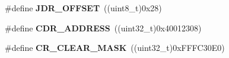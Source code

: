 \begin{DoxyCompactItemize}
\item 
\hypertarget{group___a_d_c_gad2480fae33dfd1308157c313af8e6a5d}{\#define {\bfseries J\-D\-R\-\_\-\-O\-F\-F\-S\-E\-T}~((uint8\-\_\-t)0x28)}\label{group___a_d_c_gad2480fae33dfd1308157c313af8e6a5d}

\item 
\hypertarget{group___a_d_c_ga92ecbad71393fbbf41b5d030ecc16899}{\#define {\bfseries C\-D\-R\-\_\-\-A\-D\-D\-R\-E\-S\-S}~((uint32\-\_\-t)0x40012308)}\label{group___a_d_c_ga92ecbad71393fbbf41b5d030ecc16899}

\item 
\hypertarget{group___a_d_c_ga8a5812a1d5ced986bb997a4bb7ae697d}{\#define {\bfseries C\-R\-\_\-\-C\-L\-E\-A\-R\-\_\-\-M\-A\-S\-K}~((uint32\-\_\-t)0x\-F\-F\-F\-C30\-E0)}\label{group___a_d_c_ga8a5812a1d5ced986bb997a4bb7ae697d}

\end{DoxyCompactItemize}
